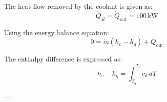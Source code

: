 The heat flow removed by the coolant is given as:  
\[
\dot{Q}_R = \dot{Q}_{\text{out}} = 100 \, \text{kW}
\]  

Using the energy balance equation:  
\[
0 = \dot{m} \left( h_c - h_q \right) + \dot{Q}_{\text{out}}
\]  

The enthalpy difference is expressed as:  
\[
h_c - h_q = \int_{T_q}^{T_c} c_{\text{if}} \, dT
\]  

---